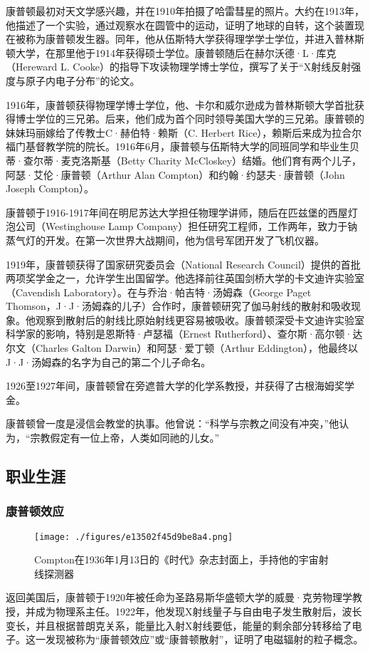 康普顿最初对天文学感兴趣，并在1910年拍摄了哈雷彗星的照片。大约在1913年，他描述了一个实验，通过观察水在圆管中的运动，证明了地球的自转，这个装置现在被称为康普顿发生器。同年，他从伍斯特大学获得理学学士学位，并进入普林斯顿大学，在那里他于1914年获得硕士学位。康普顿随后在赫尔沃德·L·库克（Hereward L. Cooke）的指导下攻读物理学博士学位，撰写了关于“X射线反射强度与原子内电子分布”的论文。

1916年，康普顿获得物理学博士学位，他、卡尔和威尔逊成为普林斯顿大学首批获得博士学位的三兄弟。后来，他们成为首个同时领导美国大学的三兄弟。康普顿的妹妹玛丽嫁给了传教士C·赫伯特·赖斯（C. Herbert Rice），赖斯后来成为拉合尔福门基督教学院的院长。1916年6月，康普顿与伍斯特大学的同班同学和毕业生贝蒂·查尔蒂·麦克洛斯基（Betty Charity McCloskey）结婚。他们育有两个儿子，阿瑟·艾伦·康普顿（Arthur Alan Compton）和约翰·约瑟夫·康普顿（John Joseph Compton）。

康普顿于1916-1917年间在明尼苏达大学担任物理学讲师，随后在匹兹堡的西屋灯泡公司（Westinghouse Lamp Company）担任研究工程师，工作两年，致力于钠蒸气灯的开发。在第一次世界大战期间，他为信号军团开发了飞机仪器。

1919年，康普顿获得了国家研究委员会（National Research Council）提供的首批两项奖学金之一，允许学生出国留学。他选择前往英国剑桥大学的卡文迪许实验室（Cavendish Laboratory）。在与乔治·帕吉特·汤姆森（George Paget Thomson，J·J·汤姆森的儿子）合作时，康普顿研究了伽马射线的散射和吸收现象。他观察到散射后的射线比原始射线更容易被吸收。康普顿深受卡文迪许实验室科学家的影响，特别是恩斯特·卢瑟福（Ernest Rutherford）、查尔斯·高尔顿·达尔文（Charles Galton Darwin）和阿瑟·爱丁顿（Arthur Eddington），他最终以J·J·汤姆森的名字为自己的第二个儿子命名。

1926至1927年间，康普顿曾在旁遮普大学的化学系教授，并获得了古根海姆奖学金。

康普顿曾一度是浸信会教堂的执事。他曾说：“科学与宗教之间没有冲突，”他认为，“宗教假定有一位上帝，人类如同祂的儿女。”
\subsection{职业生涯}
\subsubsection{康普顿效应}
\begin{figure}[ht]
\centering
\texttt{[image: ./figures/e13502f45d9be8a4.png]}
\caption{Compton在1936年1月13日的《时代》杂志封面上，手持他的宇宙射线探测器} \label{fig_KPD_3}
\end{figure}
返回美国后，康普顿于1920年被任命为圣路易斯华盛顿大学的威曼·克劳物理学教授，并成为物理系主任。1922年，他发现X射线量子与自由电子发生散射后，波长变长，并且根据普朗克关系，能量比入射X射线要低，能量的剩余部分转移给了电子。这一发现被称为“康普顿效应”或“康普顿散射”，证明了电磁辐射的粒子概念。

